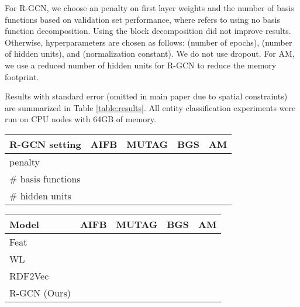 \documentclass[letterpaper]{article} \usepackage{aaai18}  \usepackage{times}  \usepackage{helvet}  \usepackage{courier}  \usepackage{url}  \usepackage{graphicx}  \frenchspacing
\begin{document}
For R-GCN, we choose an  penalty on first layer weights  and the number of basis functions  based on validation set performance, where  refers to using no basis function decomposition. Using the block decomposition did not improve results. Otherwise, hyperparameters are chosen as follows:  (number of epochs),  (number of hidden units), and  (normalization constant). We do not use dropout. For AM, we use a reduced number of  hidden units for R-GCN to reduce the memory footprint.

Results with standard error (omitted in main paper due to spatial constraints) are summarized in Table \ref{table:results}. All entity classification experiments were run on CPU nodes with 64GB of memory.

\begin{table*}[htp!]
\centering
\begin{tabular}{lrrrr}
\toprule
R-GCN setting & AIFB & MUTAG & BGS & AM  \\ \midrule
 penalty &  &  &  &  \\
\# basis functions &  &  &  &   \\
\# hidden units &  &  &  &  \\ \bottomrule
\end{tabular}
\caption{Best hyperparameter choices based on validation set performance for 2-layer R-GCN model. \label{table:hyperparams}}
\end{table*}

\begin{table*}[htp!]
\centering
\begin{tabular}{lcccc}
\toprule
Model & AIFB & MUTAG & BGS & AM  \\ \midrule
Feat &  &  &  &  \\
WL		&  &  &  &   \\
RDF2Vec  &  &  &  &  \\
R-GCN (Ours)			&  &  &   &  \\\bottomrule
\end{tabular}
\caption{Entity classification results in accuracy (average and standard error over 10 runs) for a feature-based baseline (see main text for details), WL \cite{shervashidze2011weisfeiler,de2015substructure}, RDF2Vec \cite{ristoski2016rdf2vec}, and R-GCN (this work). Test performance is reported on the train/test set splits provided by \cite{ristoski2016collection}. \label{table:results}}
\end{table*}
 
\end{document}
